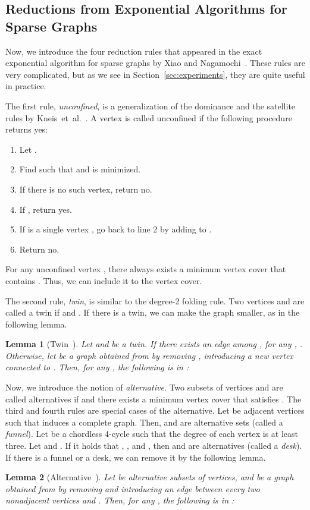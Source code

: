 \documentclass[11pt]{article}
\newtheorem{lemma}{Lemma}
\begin{document}
\subsection{Reductions from Exponential Algorithms for Sparse Graphs}\label{sec:reduction:sparse}
Now, we introduce the four reduction rules that appeared in the exact exponential algorithm for sparse graphs by
Xiao and Nagamochi~\cite{vc_reduction/nagamochi2013}.
These rules are very complicated, but as we see in Section~\ref{sec:experiments}, they are quite
useful in practice.

The first rule, \emph{unconfined}, is a generalization of the dominance
and the satellite rules by Kneis~et~al.~\cite{DBLP:conf/fsttcs/KneisLR09}.
A vertex  is called unconfined if the following procedure returns yes:
\begin{enumerate}
  \item Let .
  \item Find  such that  and  is minimized.
  \item If there is no such vertex, return no.
  \item If , return yes.
  \item If  is a single vertex , go back to line 2 by
  adding  to .
  \item Return no.
\end{enumerate}
For any unconfined vertex , there always exists a minimum vertex cover that contains .
Thus, we can include it to the vertex cover.

The second rule, \emph{twin}, is similar to the degree-2 folding rule.
Two vertices  and  are called a twin if  and .
If there is a twin, we can make the graph smaller, as in the following lemma.
\begin{lemma}[Twin~\cite{vc_reduction/nagamochi2013}]
Let  and  be a twin.
If there exists an edge among , for any , .
Otherwise, let  be a graph obtained from  by removing , introducing a new vertex  connected to .
Then, for any , the following  is in :

\end{lemma}

Now, we introduce the notion of \textit{alternative}.
Two subsets of vertices  and  are called alternatives if  and there exists a minimum vertex cover
 that satisfies .
The third and fourth rules are special cases of the alternative.
Let  be adjacent vertices such that  induces a complete graph.
Then,  and  are alternative sets (called a \emph{funnel}).
Let  be a chordless 4-cycle such that the degree of each vertex is at least three.
Let  and .
If it holds that , , and ,
then  and  are alternatives (called a \emph{desk}).
If there is a funnel or a desk, we can remove it by the following lemma.
\begin{lemma}[Alternative~\cite{vc_reduction/nagamochi2013}]
Let  be alternative subsets of vertices, and  be a graph obtained from  by removing
 and introducing an edge between every two
nonadjacent vertices  and .
Then, for any , the following  is in :

\end{lemma}
\end{document}
